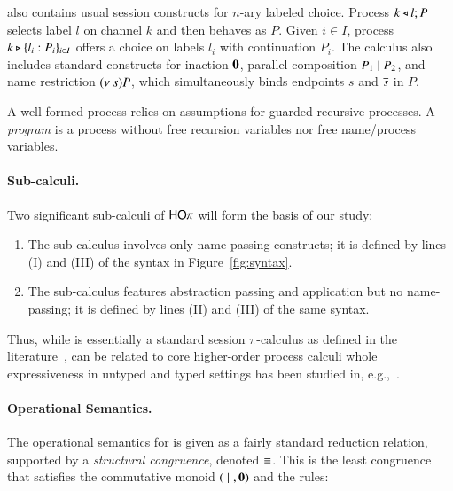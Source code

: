 \HOp also contains usual session constructs for $n$-ary labeled choice.
Process $k \triangleleft l ; P$ selects label $l$ on channel $k$ and then behaves as $P$. 
Given $i \in I$, 
process $k \triangleright \{l_i:P_i\}_{i \in I}$ offers a choice on labels $l_i$ with continuation $P_i$.
The calculus also includes standard constructs for 
inaction $\mathbf{0}$, 
parallel composition $P_1 \;|\; P_2$, and 
name restriction $(\nu\ s) P$, which simultaneously binds endpoints $s$ and $\overline{s}$ in $P$.


A well-formed process relies on assumptions for guarded recursive processes.
A \emph{program} is a process without free 
recursion variables nor free name/process variables.



\paragraph{Sub-calculi.}
Two significant sub-calculi of $\mathsf{HO}\pi$ will form the basis of our study:
\begin{enumerate}[-]
\item The sub-calculus \sesp involves only name-passing constructs; it is 
defined by lines (\textsc{I}) and (\textsc{III}) of the syntax in Figure~\ref{fig:syntax}.
\item The sub-calculus \HO features abstraction passing and application but no name-passing; 
it is defined by lines (\textsc{II}) and (\textsc{III}) of the same syntax.
\end{enumerate}
Thus, while \sesp is essentially a standard session $\pi$-calculus as defined in the literature~\cite{},
\HO can be related to core higher-order process calculi whole expressiveness in untyped and typed settings
has been studied in, e.g.,~\cite{}.


\paragraph{Operational Semantics.}
The operational semantics for \HOp is given as a fairly standard reduction relation, supported by
a \emph{structural congruence}, denoted $\equiv$. This is 
the least congruence that satisfies the commutative monoid $(\;|\;, \mathbf{0})$
and the rules:

